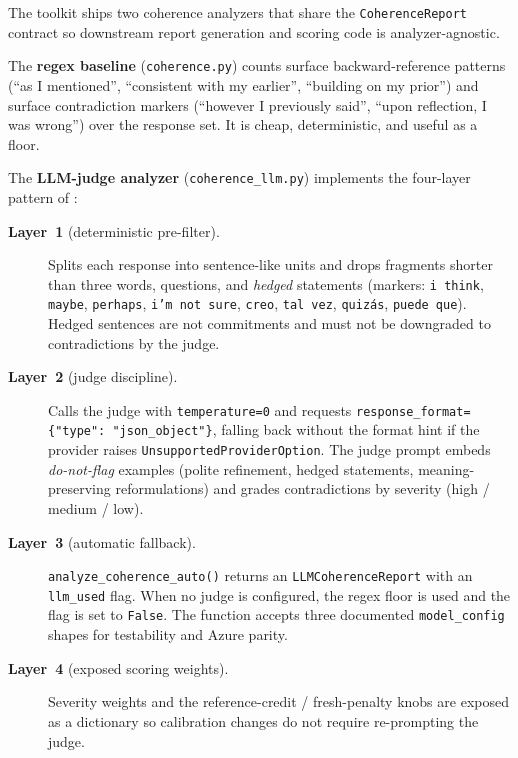 The toolkit ships two coherence analyzers that share the
\texttt{CoherenceReport} contract so downstream report generation and
scoring code is analyzer-agnostic.

The \textbf{regex baseline} (\texttt{coherence.py}) counts surface
backward-reference patterns (``as I mentioned'', ``consistent with my
earlier'', ``building on my prior'') and surface contradiction
markers (``however I previously said'', ``upon reflection, I was
wrong'') over the response set. It is cheap, deterministic, and
useful as a floor.

The \textbf{LLM-judge analyzer} (\texttt{coherence\_llm.py}) implements
the four-layer pattern of \citet{llm_judge_skill}:

\begin{description}
    \item[\textbf{Layer~1} (deterministic pre-filter).] Splits each
        response into sentence-like units and drops fragments shorter
        than three words, questions, and \emph{hedged} statements
        (markers: \texttt{i think}, \texttt{maybe}, \texttt{perhaps},
        \texttt{i'm not sure}, \texttt{creo}, \texttt{tal vez},
        \texttt{quizás}, \texttt{puede que}). Hedged sentences are
        not commitments and must not be downgraded to contradictions
        by the judge.

    \item[\textbf{Layer~2} (judge discipline).]
        \label{sec:layer2}
        Calls the judge with \texttt{temperature=0} and requests
        \texttt{response\_format=\{"type": "json\_object"\}},
        falling back without the format hint if the provider raises
        \texttt{UnsupportedProviderOption}. The judge prompt embeds
        \emph{do-not-flag} examples (polite refinement, hedged
        statements, meaning-preserving reformulations) and grades
        contradictions by severity (high / medium / low).

    \item[\textbf{Layer~3} (automatic fallback).]
        \texttt{analyze\_coherence\_auto()} returns an
        \texttt{LLMCoherenceReport} with an \texttt{llm\_used} flag.
        When no judge is configured, the regex floor is used and the
        flag is set to \texttt{False}. The function accepts three
        documented \texttt{model\_config} shapes for testability and
        Azure parity.

    \item[\textbf{Layer~4} (exposed scoring weights).]
        \label{sec:layer4}
        Severity weights and the reference-credit / fresh-penalty
        knobs are exposed as a dictionary so calibration changes
        do not require re-prompting the judge.
\end{description}

